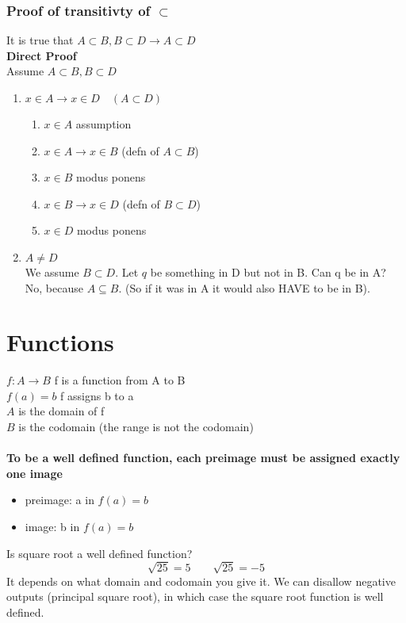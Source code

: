 \documentclass[12pt]{article}
\begin{document}
	\subsubsection{Proof of transitivty of $\subset$}
	It is true that $A \subset B, B \subset D \rightarrow A \subset D$ \\
	\textbf{Direct Proof}\\
	Assume $A \subset B, B \subset D$
	\begin{enumerate}
		\item $x \in A \rightarrow x \in D \quad (A \subset D) $
			\begin{enumerate}
				\item $x \in A$ \qquad assumption
				\item $x \in A \rightarrow x \in B$ \qquad (defn of $A \subset B$)
				\item $x \in B$ \qquad modus ponens
				\item $x \in B \rightarrow x \in D$ (defn of $B \subset D$)
				\item $x \in D$ \qquad modus ponens
			\end{enumerate}
		\item $A \neq D$ \\
			We assume $B \subset D$. Let $q$ be something in D but not in B. Can q be in A? No, because $A \subseteq B$. (So if it was in A it would also HAVE to be in B).
	\end{enumerate}
	\section{Functions}
	$f: A \rightarrow B$ \qquad f is a function from A to B \\
	$f(a) = b$ \qquad f assigns b to a \\
	$A$ is the domain of f \\
	$B$ is the codomain (the range is not the codomain) \\\\
	\textbf{To be a well defined function, each preimage must be assigned exactly one image}
	\begin{itemize}
		\item preimage: a in $f(a) = b$
		\item image: b in $f(a) = b$
	\end{itemize}
	Is square root a well defined function?
	$$\sqrt{25} = 5 \qquad \sqrt{25} = -5$$
	It depends on what domain and codomain you give it. We can disallow negative outputs (principal square root), in which case the square root function is well defined.
\end{document}
